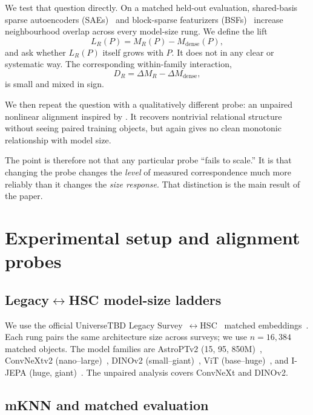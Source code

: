 \documentclass[11pt]{article}
\begin{document}
We test that question directly.
On a matched held-out evaluation, shared-basis sparse autoencoders (SAEs)~\citep{gao2025sae,lan2024saeuniversality} and block-sparse featurizers (BSFs)~\citep{fel2026bsf} increase neighbourhood overlap across every model-size rung.
We define the lift
\[
L_R(P)=M_R(P)-M_{\mathrm{dense}}(P),
\]
and ask whether \(L_R(P)\) itself grows with \(P\).
It does not in any clear or systematic way.
The corresponding within-family interaction,
\[
D_R=\Delta M_R-\Delta M_{\mathrm{dense}},
\]
is small and mixed in sign.

We then repeat the question with a qualitatively different probe: an unpaired nonlinear alignment inspired by \citet{jha2025vec2vec}.
It recovers nontrivial relational structure without seeing paired training objects, but again gives no clean monotonic relationship with model size.

The point is therefore not that any particular probe ``fails to scale.''
It is that changing the probe changes the \emph{level} of measured correspondence much more reliably than it changes the \emph{size response}.
That distinction is the main result of the paper.

\section{Experimental setup and alignment probes}
\label{sec:setup}

\subsection{Legacy\(\leftrightarrow\)HSC model-size ladders}

We use the official UniverseTBD Legacy Survey~\citep{dey2019legacy}\(\leftrightarrow\)HSC~\citep{miyazaki2018hsc} matched embeddings~\citep{duraphe2025platonicuniverse}.
Each rung pairs the same architecture size across surveys; we use \(n{=}16{,}384\) matched objects.
The model families are AstroPTv2 (15, 95, 850M)~\citep{smith2024astropt},
ConvNeXtv2 (nano--large)~\citep{woo2023convnextv2},
DINOv2 (small--giant)~\citep{oquab2024dinov2},
ViT (base--huge)~\citep{dosovitskiy2021vit},
and I-JEPA (huge, giant)~\citep{assran2023ijepa}.
The unpaired analysis covers ConvNeXt and DINOv2.

\subsection{mKNN and matched evaluation}
\end{document}
